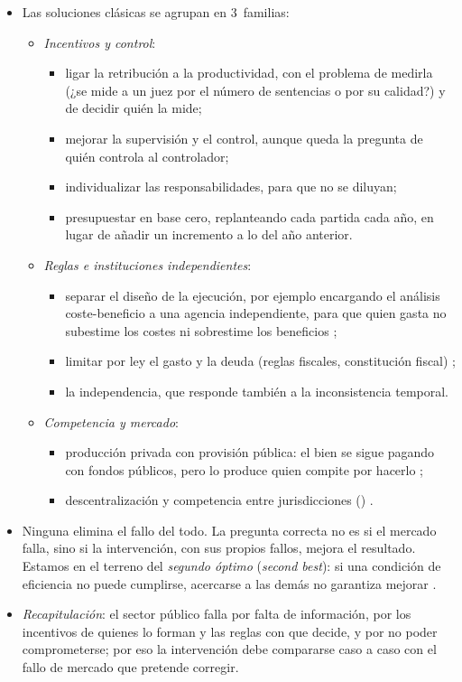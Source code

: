 \documentclass[11pt]{article}
\begin{document}
\begin{itemize}
\item Las soluciones clásicas se agrupan en 3~familias:
  \begin{itemize}
  \item \emph{Incentivos y control}:
    \begin{itemize}
    \item ligar la retribución a la productividad, con el problema de medirla (¿se mide a un juez por el número de sentencias o por su calidad?) y de decidir quién la mide;
    \item mejorar la supervisión y el control, aunque queda la pregunta de quién controla al controlador;
    \item individualizar las responsabilidades, para que no se diluyan;
    \item presupuestar en base cero, replanteando cada partida cada año, en lugar de añadir un incremento a lo del año anterior.
    \end{itemize}
  \item \emph{Reglas e instituciones independientes}:
    \begin{itemize}
    \item separar el diseño de la ejecución, por ejemplo encargando el análisis coste-beneficio a una agencia independiente, para que quien gasta no subestime los costes ni sobrestime los beneficios ;
    \item limitar por ley el gasto y la deuda (reglas fiscales, constitución fiscal) ;
    \item la independencia, que responde también a la inconsistencia temporal.
    \end{itemize}
  \item \emph{Competencia y mercado}:
    \begin{itemize}
    \item producción privada con provisión pública: el bien se sigue pagando con fondos públicos, pero lo produce quien compite por hacerlo ;
    \item descentralización y competencia entre jurisdicciones () .
    \end{itemize}
  \end{itemize}
\item Ninguna elimina el fallo del todo. La pregunta correcta no es si el mercado falla, sino si la intervención, con sus propios fallos, mejora el resultado. Estamos en el terreno del \emph{segundo óptimo} (\emph{second best}): si una condición de eficiencia no puede cumplirse, acercarse a las demás no garantiza mejorar\nocite{LipseyLancaster1956General} .
\item \emph{Recapitulación}: el sector público falla por falta de información, por los incentivos de quienes lo forman y las reglas con que decide, y por no poder comprometerse; por eso la intervención debe compararse caso a caso con el fallo de mercado que pretende corregir.
\end{itemize}
\end{document}
